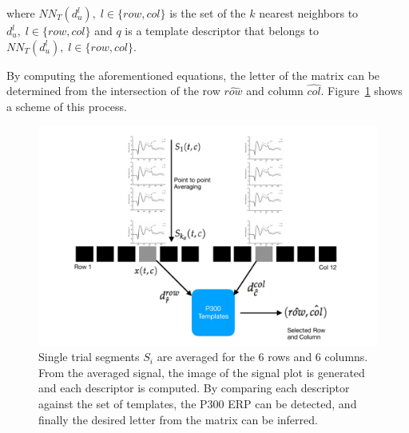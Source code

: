 \documentclass[entropy,article,submit,moreauthors,pdftex,10pt,a4paper]{mdpi}
\begin{document}
\begin{enumerate}
where $NN_T(d^l_u), \;l\in\{row,{col}\}$ is the set of the $k$ nearest neighbors to $d^l_u, \;l\in\{row,{col}\}$ and $q$ is a template descriptor that belongs to $NN_T(d^l_u), \;l\in\{row,{col}\}$.  


\end{enumerate}
By computing the aforementioned equations, the letter of the matrix can be determined from the intersection of the row $ \hat{row} $ and column $ \hat{col} $. 
Figure~\ref{fig:classification} shows a scheme of this process. 
\begin{figure}[htp]
\centering
\includegraphics[width=15cm]{classificationgraph.pdf}
\caption{Single trial segments $S_i$ are averaged for the 6 rows and 6 columns. From the averaged signal, the image of the signal plot is generated and each descriptor is computed.  By comparing each descriptor against the set of templates, the P300 ERP can be detected, and finally the desired letter from the matrix can be inferred.}
\label{fig:classification}
\end{figure}
\end{document}
